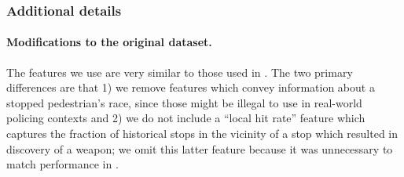 \subsubsection{Additional details}
\paragraph{Modifications to the original dataset.}
The features we use are very similar to those used in \citet{goel_precinct_2016}. The two primary differences are that 1) we remove features which convey information about a stopped pedestrian's race, since those might be illegal to use in real-world policing contexts and 2) we do not include a ``local hit rate'' feature which captures the fraction of historical stops in the vicinity of a stop which resulted in discovery of a weapon; we omit this latter feature because it was unnecessary to match performance in \citet{goel_precinct_2016}.
